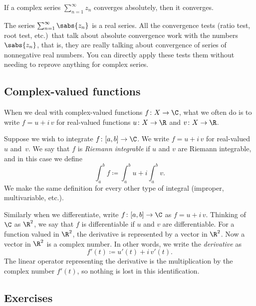 \begin{prop} \label{prop:absconvmeansconv}
If a complex series $\sum_{n=1}^\infty z_n$ converges absolutely, then it converges.
\end{prop}

The series $\sum_{n=1}^\infty \sabs{z_n}$ is a real series.  All the
convergence tests (ratio test, root test, etc.)\ that talk about
absolute convergence work with the numbers $\sabs{z_n}$, that is, they
are really talking about convergence of series of nonnegative real
numbers.
You
can directly apply these tests
them without needing to reprove anything for complex
series.

\subsection{Complex-valued functions}

When we deal with complex-valued functions
$f \colon X \to \C$, what we often do is to write
$f = u+i\,v$ for real-valued functions $u \colon X \to \R$ and $v \colon X \to
\R$.

Suppose we wish to integrate
$f \colon [a,b] \to \C$.  We write
$f = u+i\,v$ for real-valued $u$ and~$v$.
We say that $f$ is \emph{Riemann integrable}
if $u$ and $v$ are Riemann
integrable, and in this case we define
\begin{equation*}
\int_a^b f \coloneqq \int_a^b u + i \int_a^b v .
\end{equation*}
We make the same definition for every other type of integral (improper,
multivariable, etc.).

Similarly when we differentiate, write $f \colon [a,b] \to \C$ as
$f = u+i\,v$.  Thinking of $\C$ as $\R^2$, we say that $f$ is differentiable
if $u$ and $v$ are differentiable.  For a function valued in $\R^2$, the derivative
is represented by a vector in $\R^2$.  Now a vector in $\R^2$ is a complex
number.  In other words,
we write
the
\emph{derivative}
as
\begin{equation*}
f'(t) \coloneqq u'(t) + i \, v'(t) .
\end{equation*}
The linear operator representing the derivative is the multiplication by
the complex number $f'(t)$, so nothing is lost in this identification.


\subsection{Exercises}

